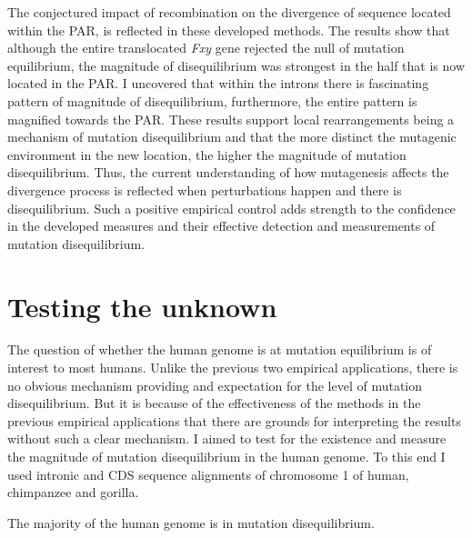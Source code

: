 

The conjectured impact of recombination on the divergence of sequence located within the PAR, is reflected in these developed methods. The results show that although the entire translocated \textit{Fxy} gene rejected the null of mutation equilibrium, the magnitude of disequilibrium was strongest in the half that is now located in the PAR. I uncovered that within the introns there is fascinating pattern of magnitude of disequilibrium, furthermore, the entire pattern is magnified towards the PAR. These results support local rearrangements being a mechanism of mutation disequilibrium and that the more distinct the mutagenic environment in the new location, the higher the magnitude of mutation disequilibrium. Thus, the current understanding of how mutagenesis affects the divergence process is reflected when perturbations happen and there is disequilibrium. Such a positive empirical control adds strength to the confidence in the developed measures and their effective detection and measurements of mutation disequilibrium. 

\section{Testing the unknown}

The question of whether the human genome is at mutation equilibrium is of interest to most humans. Unlike the previous two empirical applications, there is no obvious mechanism providing and expectation for the level of mutation disequilibrium. But it is because of the effectiveness of the methods in the previous empirical applications that there are grounds for interpreting the results without such a clear mechanism. I aimed to test for the existence and measure the magnitude of mutation disequilibrium in the human genome. To this end I used  intronic and CDS sequence alignments of chromosome 1 of human, chimpanzee and gorilla. 

The majority of the human genome is in mutation disequilibrium. 

